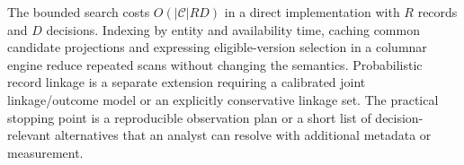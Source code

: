The bounded search costs $O(|\mathcal C|RD)$ in a direct implementation
with $R$ records and $D$ decisions. Indexing by entity and availability
time, caching common candidate projections and expressing eligible-version
selection in a columnar engine reduce repeated scans without changing the
semantics. Probabilistic record linkage is a separate extension requiring
a calibrated joint linkage/outcome model or an explicitly conservative
linkage set. The practical stopping point is a reproducible observation
plan or a short list of decision-relevant alternatives that an analyst can
resolve with additional metadata or measurement.
